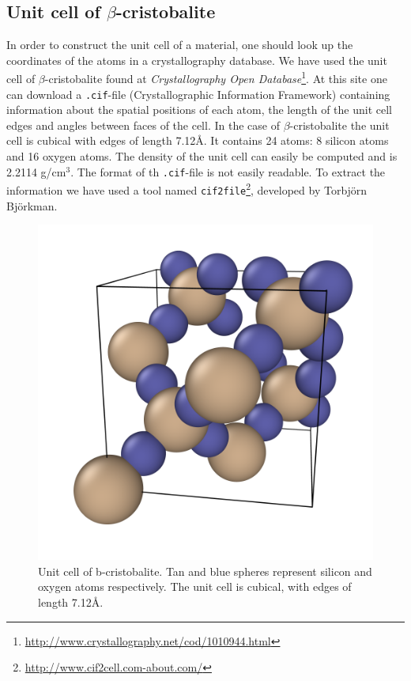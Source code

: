 \documentclass[twoside,english]{uiofysmaster}
\begin{document}
\subsection{Unit cell of $\beta$-cristobalite}
In order to construct the unit cell of a material, one should look up the coordinates of the atoms in a crystallography database. We have used the unit cell of $\beta$-cristobalite found at \textit{Crystallography Open Database}\footnote{\href{http://www.crystallography.net/cod/1010944.html}{http://www.crystallography.net/cod/1010944.html}}. 
At this site one can download a \texttt{.cif}-file (Crystallographic Information Framework) containing information about the spatial positions of each atom, the length of the unit cell edges and angles between faces of the cell. 
In the case of $\beta$-cristobalite the unit cell is cubical with edges of length 7.12Å. 
It contains 24 atoms: 8 silicon atoms and 16 oxygen atoms. 
The density of the unit cell can easily be computed and is 2.2114 g/cm$^3$.
The format of th \texttt{.cif}-file is not easily readable. To extract the information we have used a tool named \texttt{cif2file}\footnote{\href{http://www.cif2cell.com-about.com/}{http://www.cif2cell.com-about.com/}}, developed by Torbjörn Björkman. 

\begin{figure}
	\centering
	\includegraphics[width=0.6\linewidth]{figures/unitcell/unitcell.png}
	\caption{Unit cell of b-cristobalite. Tan and blue spheres represent silicon and oxygen atoms respectively. The unit cell is cubical, with edges of length 7.12Å.}
	\label{fig:unitcellbcristobalite}
\end{figure}
\end{document}
